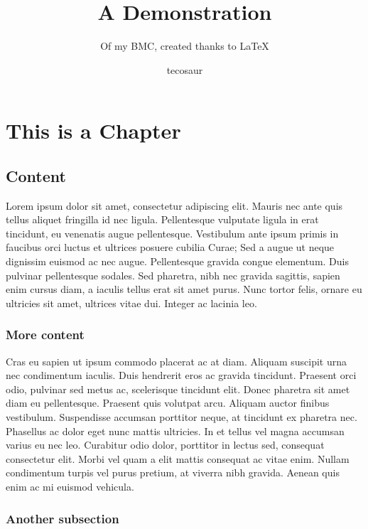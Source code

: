 \documentclass[sans,math-serif,solid,chem,code,notes]{bmc}
\title{A Demonstration}
\subtitle{Of my BMC, created thanks to \LaTeX}
\author{tecosaur}
\begin{document}
\maketitle{}
\fancytoc{}

\chapter{This is a Chapter}

\section{Content}
Lorem ipsum dolor sit amet, consectetur adipiscing elit. Mauris nec ante quis tellus aliquet fringilla id nec ligula. Pellentesque vulputate ligula in erat tincidunt, eu venenatis augue pellentesque. Vestibulum ante ipsum primis in faucibus orci luctus et ultrices posuere cubilia Curae; Sed a augue ut neque dignissim euismod ac nec augue. Pellentesque gravida congue elementum. Duis pulvinar pellentesque sodales. Sed pharetra, nibh nec gravida sagittis, sapien enim cursus diam, a iaculis tellus erat sit amet purus. Nunc tortor felis, ornare eu ultricies sit amet, ultrices vitae dui. Integer ac lacinia leo.

\subsection{More content}
Cras eu sapien ut ipsum commodo placerat ac at diam. Aliquam suscipit urna nec condimentum iaculis. Duis hendrerit eros ac gravida tincidunt. Praesent orci odio, pulvinar sed metus ac, scelerisque tincidunt elit. Donec pharetra sit amet diam eu pellentesque. Praesent quis volutpat arcu. Aliquam auctor finibus vestibulum. Suspendisse accumsan porttitor neque, at tincidunt ex pharetra nec. Phasellus ac dolor eget nunc mattis ultricies. In et tellus vel magna accumsan varius eu nec leo. Curabitur odio dolor, porttitor in lectus sed, consequat consectetur elit. Morbi vel quam a elit mattis consequat ac vitae enim. Nullam condimentum turpis vel purus pretium, at viverra nibh gravida. Aenean quis enim ac mi euismod vehicula.


\subsection{Another subsection}
\end{document}
